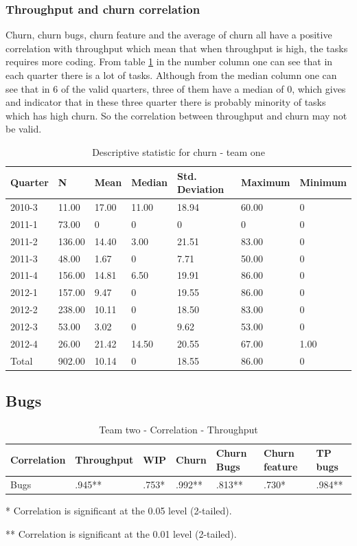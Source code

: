 \documentclass[UKenglish]{ifimaster}  %
\begin{document}
\subsubsection{Throughput and churn correlation}
Churn, churn bugs, churn feature and the average of churn all have a positive correlation with throughput which mean that when throughput is high, the tasks requires more coding. From table \ref{dsc:1} in the number column one can see that in each quarter there is a lot of tasks. Although from the median column one can see that in 6 of the valid quarters, three of them have a median of 0, which gives and indicator that in these three quarter there is probably minority of tasks which has high churn.  So the correlation between throughput and churn may not be valid.

\begin{table}[!htbp] 
\begin{tabular}{ | l | l | l | l | l | l | l | }
\hline
Quarter & N & Mean & Median & Std. Deviation & Maximum & Minimum \\ \hline
	2010-3 & 11.00 & 17.00 & 11.00 & 18.94 & 60.00 & 0\\ \hline
	2011-1 & 73.00 & 0 & 0 & 0 & 0 & 0\\ \hline
	2011-2 & 136.00 & 14.40 & 3.00 & 21.51 & 83.00 & 0\\ \hline
	2011-3 & 48.00 & 1.67 & 0 & 7.71 & 50.00 & 0\\ \hline
	2011-4 & 156.00 & 14.81 & 6.50 & 19.91 & 86.00 & 0\\ \hline
	2012-1 & 157.00 & 9.47 & 0 & 19.55 & 86.00 & 0\\ \hline
	2012-2 & 238.00 & 10.11 & 0 & 18.50 & 83.00 & 0\\ \hline
	2012-3 & 53.00 & 3.02 & 0 & 9.62 & 53.00 & 0\\ \hline
	2012-4 & 26.00 & 21.42 & 14.50 & 20.55 & 67.00 & 1.00\\ \hline
	Total & 902.00 & 10.14 & 0 & 18.55 & 86.00 & 0\\ \hline
\end{tabular}
\caption{Descriptive statistic for churn - team one }
\label{dsc:1} %
\end{table}


\subsection {Bugs}
\begin{table}[!htbp] 
 \centering 
 \begin{tabular}{|l|l|l|l|l|l|l|} 
\hline 
Correlation  & Throughput & WIP & Churn & Churn Bugs & Churn feature & TP bugs \\ \hline 
	Bugs & .945** & .753* & .992** & .813** & .730* & .984** \\ \hline 

\end{tabular} 
\caption{Team two - Correlation - Throughput }%
   \centerline {* Correlation is significant at the 0.05 level (2-tailed).}
      \centerline{  ** Correlation is significant at the 0.01 level (2-tailed).}
\end{table}  
\end{document}
